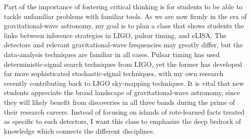 \documentclass[11pt,letterpaper,sans]{moderncv} %
\begin{document}

Part of the importance of fostering critical thinking is for students to be able to tackle unfamiliar problems with familiar tools. %
As we are now firmly in the era of gravitational-wave astronomy, my goal is to plan a class that shows students the links between inference strategies in LIGO, pulsar timing, and eLISA. The detectors and relevant gravitational-wave frequencies may greatly differ, but the data-analysis techniques are familiar in all cases. Pulsar timing has used deterministic-signal search techniques from LIGO, yet the former has developed far more sophisticated stochastic-signal techniques, with my own research recently contributing back to LIGO sky-mapping techniques. It is vital that new students appreciate the broad landscape of gravitational-wave astronomy, since they will likely benefit from discoveries in all three bands during the prime of their research careers. Instead of focusing on islands of rote-learned facts treated as specific to each detectors, I want this class to emphasize the deep bedrock of knowledge which connects the different disciplines. 
\vspace{2mm}
\end{document}
